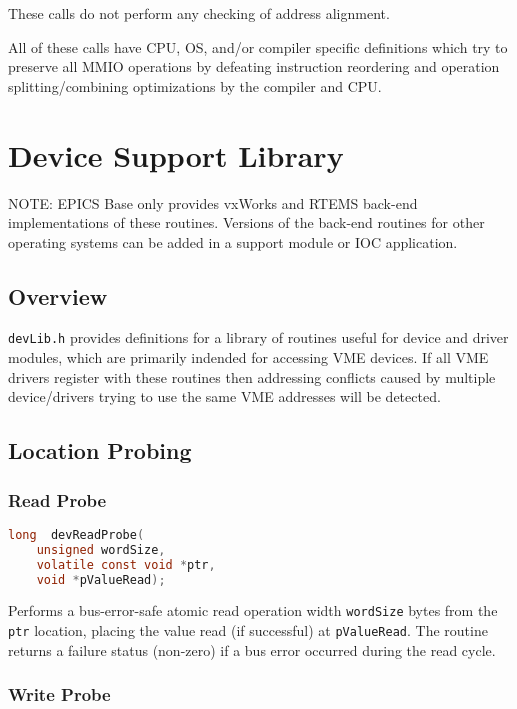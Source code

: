 These calls do not perform any checking of address alignment.

All of these calls have CPU, OS, and/or compiler specific definitions which
try to preserve all MMIO operations by defeating instruction reordering
and operation splitting/combining optimizations by the compiler and CPU.

\section{ Device Support Library}

NOTE: EPICS Base only provides vxWorks and RTEMS back-end implementations of these routines.
Versions of the back-end routines for other operating systems can be added in a support module or IOC application.

\subsection{Overview}

\verb|devLib.h| provides definitions for a library of routines useful for device and driver modules, which are primarily indended for accessing VME devices.
If all VME drivers register with these routines  then  addressing conflicts caused by multiple device/drivers trying to use the same VME addresses will be detected.

\subsection{Location Probing}

\subsubsection{Read Probe}

\begin{lstlisting}[language=C]
long  devReadProbe(
    unsigned wordSize,
    volatile const void *ptr,
    void *pValueRead);
\end{lstlisting}

Performs a bus-error-safe atomic read operation width \verb|wordSize| bytes from the \verb|ptr| location, placing the value read (if successful) at \verb|pValueRead|.
The routine returns a failure status (non-zero) if a bus error occurred during the read cycle.

\subsubsection{Write Probe}

